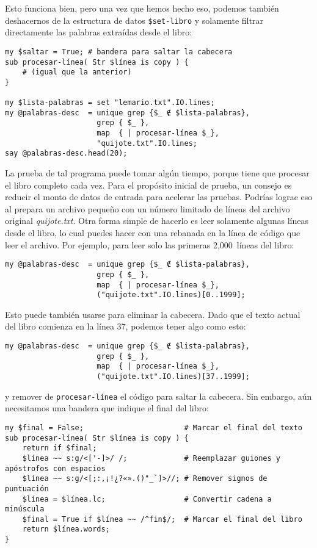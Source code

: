 Esto funciona bien, pero una vez que hemos hecho eso, podemos
también deshacernos de la estructura de datos \verb|$set-libro|
y solamente filtrar directamente las palabras extraídas desde
el libro:

\begin{verbatim}
my $saltar = True; # bandera para saltar la cabecera
sub procesar-línea( Str $línea is copy ) {
    # (igual que la anterior)
}

my $lista-palabras = set "lemario.txt".IO.lines;
my @palabras-desc  = unique grep {$_ ∉ $lista-palabras}, 
                     grep { $_ }, 
                     map  { | procesar-línea $_},  
                     "quijote.txt".IO.lines; 
say @palabras-desc.head(20);
\end{verbatim}

La prueba de tal programa puede tomar algún tiempo, porque
tiene que procesar el libro completo cada vez. Para 
el propósito inicial de prueba, un consejo es reducir el monto
de datos de entrada para acelerar las pruebas. Podrías lograe
eso al prepara un archivo pequeño con un número limitado de
líneas del archivo original \emph{quijote.txt}. Otra forma
simple de hacerlo es leer solamente algunas líneas desde el libro,
lo cual puedes hacer con una rebanada en la línea de código
que leer el archivo. Por ejemplo, para leer solo las primeras
2,000~líneas del libro:

\begin{verbatim}
my @palabras-desc  = unique grep {$_ ∉ $lista-palabras}, 
                     grep { $_ }, 
                     map  { | procesar-línea $_},  
                     ("quijote.txt".IO.lines)[0..1999];
\end{verbatim}

Esto puede también usarse para eliminar la cabecera. Dado que 
el texto actual del libro comienza en la línea 37, podemos tener
algo como esto:

\begin{verbatim}
my @palabras-desc  = unique grep {$_ ∉ $lista-palabras}, 
                     grep { $_ }, 
                     map  { | procesar-línea $_},  
                     ("quijote.txt".IO.lines)[37..1999];
\end{verbatim}
y remover de {\tt procesar-línea} el código para saltar la cabecera.
Sin embargo, aún necesitamos una bandera que indique el final del libro:

\begin{verbatim}
my $final = False;                       # Marcar el final del texto
sub procesar-línea( Str $línea is copy ) {
    return if $final;
    $línea ~~ s:g/<['-]>/ /;             # Reemplazar guiones y apóstrofos con espacios
    $línea ~~ s:g/<[;:,¡!¿?«».()"_`]>//; # Remover signos de puntuación
    $línea = $línea.lc;                  # Convertir cadena a minúscula
    $final = True if $línea ~~ /^fin$/;  # Marcar el final del libro
    return $línea.words;
}
\end{verbatim}


